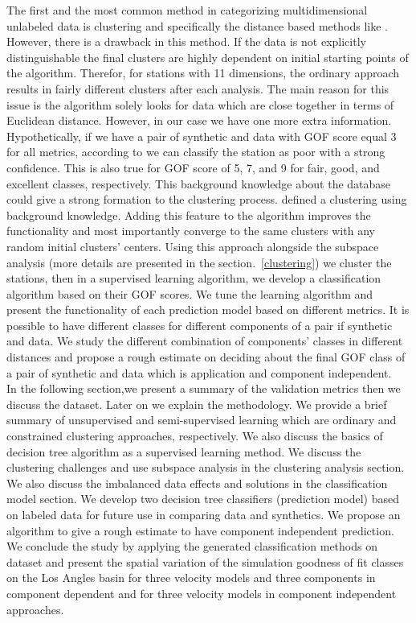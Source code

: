 The first and the most common method in categorizing multidimensional unlabeled data is clustering and specifically the distance based methods like \kmeans{} \citep{Macqueen_1967_Proc}. However, there is a drawback in this method. If the data is not explicitly distinguishable the final clusters are highly dependent on initial starting points of the algorithm. Therefor, for stations with 11 dimensions, the ordinary \kmeans{} approach results in fairly different clusters after each analysis. The main reason for this issue is the algorithm solely looks for data which are close together in terms of Euclidean distance. However, in our case we have one more extra information. Hypothetically, if we have a pair of synthetic and data with GOF score equal 3 for all metrics, according to \citet{Anderson_2004_Proc} we can classify the station as poor with a strong confidence. This is also true for GOF score of 5, 7, and 9 for fair, good, and excellent classes, respectively. This background knowledge about the database could give a strong formation to the clustering process. \citet{Wagstaff_2001_Proc} defined a \kmeans{} clustering using background knowledge. Adding this feature to the algorithm improves the functionality and most importantly converge to the same clusters with any random initial clusters' centers. Using this approach alongside the subspace analysis (more details are presented in the section.~\ref{clustering}) we cluster the stations, then in a supervised learning algorithm, we develop a classification algorithm based on their GOF scores. We tune the learning algorithm and present the functionality of each prediction model based on different metrics. It is possible to have different classes for different components of a pair if synthetic and data. We study the different combination of components' classes in different distances and propose a rough estimate on deciding about the final GOF class of a pair of synthetic and data which is application and component independent.\\
In the following section,we present a summary of the validation metrics then we discuss the dataset. Later on we explain the methodology. We provide a brief summary of unsupervised  and semi-supervised learning which are ordinary and constrained clustering approaches, respectively. We also discuss the basics of decision tree algorithm as a supervised learning method. We discuss the clustering challenges and use subspace analysis in the clustering analysis section. We also discuss the imbalanced data effects and solutions in the classification model section. We develop two decision tree classifiers (prediction model) based on labeled data for future use in comparing data and synthetics. We propose an algorithm to give a rough estimate to have component independent prediction. We conclude the study by applying the generated classification methods on \citet{Taborda_2014_BSSA} dataset and present the spatial variation of the simulation goodness of fit classes on the Los Angles basin for three velocity models and three components in component dependent and for three velocity models in component independent approaches. 




